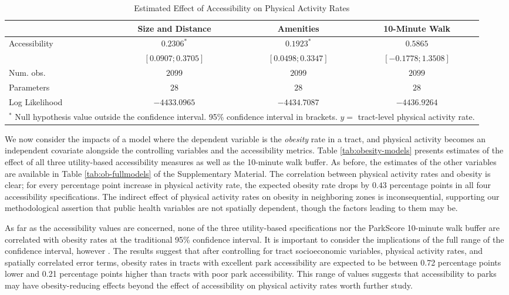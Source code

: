 \documentclass[Crown,sageh.bst]{sagej}
\begin{document}
\begin{table*}
\caption{Estimated Effect of Accessibility on Physical Activity Rates}
\label{tab:pa-models}

\begin{tabular}{l c c c}
\toprule
 & Size and Distance & Amenities & 10-Minute Walk \\
\midrule
Accessibility  & $0.2306^{*}$        & $0.1923^{*}$        & $0.5865$             \\
               & $ [0.0907; 0.3705]$ & $ [0.0498; 0.3347]$ & $ [-0.1778; 1.3508]$ \\
\midrule
Num. obs.      & $2099$              & $2099$              & $2099$               \\
Parameters     & $28$                & $28$                & $28$                 \\
Log Likelihood & $-4433.0965$        & $-4434.7087$        & $-4436.9264$         \\
\bottomrule
\multicolumn{4}{l}{\scriptsize{$^*$ Null hypothesis value outside the confidence interval. 95\% confidence interval in brackets.  $y = $ tract-level physical activity rate.}}
\end{tabular}
\end{table*}

We now consider the impacts of a model where the dependent variable is
the \emph{obesity} rate in a tract, and physical activity becomes an
independent covariate alongside the controlling variables and the
accessibility metrics. Table \ref{tab:obesity-models} presents estimates
of the effect of all three utility-based accessibility measures as well
as the 10-minute walk buffer. As before, the estimates of the other
variables are available in Table \ref{tab:ob-fullmodels} of the
Supplementary Material. The correlation between physical activity rates
and obesity is clear; for every percentage point increase in physical
activity rate, the expected obesity rate drops by \(0.43\) percentage
points in all four accessibility specifications. The indirect effect of
physical activity rates on obesity in neighboring zones is
inconsequential, supporting our methodological assertion that public
health variables are not spatially dependent, though the factors leading
to them may be.

As far as the accessibility values are concerned, none of the three
utility-based specifications nor the ParkScore 10-minute walk buffer are
correlated with obesity rates at the traditional 95\% confidence
interval. It is important to consider the implications of the full range
of the confidence interval, however \citep{Amrhein2019}. The results
suggest that after controlling for tract socioeconomic variables,
physical activity rates, and spatially correlated error terms, obesity
rates in tracts with excellent park accessibility are expected to be
between 0.72 percentage points lower and 0.21 percentage points higher
than tracts with poor park accessibility. This range of values suggests
that accessibility to parks may have obesity-reducing effects beyond the
effect of accessibility on physical activity rates worth further study.
\end{document}
